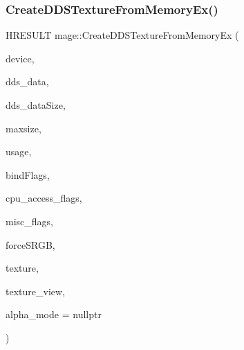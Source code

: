 \hypertarget{namespacemage_a7102f0f3479074447a084e95bce3cc14}{}\label{namespacemage_a7102f0f3479074447a084e95bce3cc14} 
\subsubsection{\texorpdfstring{Create\+D\+D\+S\+Texture\+From\+Memory\+Ex()}{CreateDDSTextureFromMemoryEx()}\hspace{0.1cm}{\footnotesize\ttfamily [1/4]}}
{\footnotesize\ttfamily H\+R\+E\+S\+U\+LT mage\+::\+Create\+D\+D\+S\+Texture\+From\+Memory\+Ex (\begin{DoxyParamCaption}\item[{\+\_\+\+In\+\_\+ I\+D3\+D11\+Device2 $\ast$}]{device,  }\item[{\+\_\+\+In\+\_\+reads\+\_\+bytes\+\_\+(dds\+\_\+data\+Size) const uint8\+\_\+t $\ast$}]{dds\+\_\+data,  }\item[{\+\_\+\+In\+\_\+ size\+\_\+t}]{dds\+\_\+data\+Size,  }\item[{\+\_\+\+In\+\_\+ size\+\_\+t}]{maxsize,  }\item[{\+\_\+\+In\+\_\+ D3\+D11\+\_\+\+U\+S\+A\+GE}]{usage,  }\item[{\+\_\+\+In\+\_\+ uint32\+\_\+t}]{bind\+Flags,  }\item[{\+\_\+\+In\+\_\+ uint32\+\_\+t}]{cpu\+\_\+access\+\_\+flags,  }\item[{\+\_\+\+In\+\_\+ uint32\+\_\+t}]{misc\+\_\+flags,  }\item[{\+\_\+\+In\+\_\+ bool}]{force\+S\+R\+GB,  }\item[{\+\_\+\+Outptr\+\_\+opt\+\_\+ I\+D3\+D11\+Resource $\ast$$\ast$}]{texture,  }\item[{\+\_\+\+Outptr\+\_\+opt\+\_\+ I\+D3\+D11\+Shader\+Resource\+View $\ast$$\ast$}]{texture\+\_\+view,  }\item[{\+\_\+\+Out\+\_\+opt\+\_\+ \hyperlink{namespacemage_a0c586a2bad862f4858900ca121ca80c2}{D\+D\+S\+\_\+\+A\+L\+P\+H\+A\+\_\+\+M\+O\+DE} $\ast$}]{alpha\+\_\+mode = {\ttfamily nullptr} }\end{DoxyParamCaption})}

\hypertarget{namespacemage_a1325dd45fa581827025d0207029bb7f0}{}\label{namespacemage_a1325dd45fa581827025d0207029bb7f0} 
